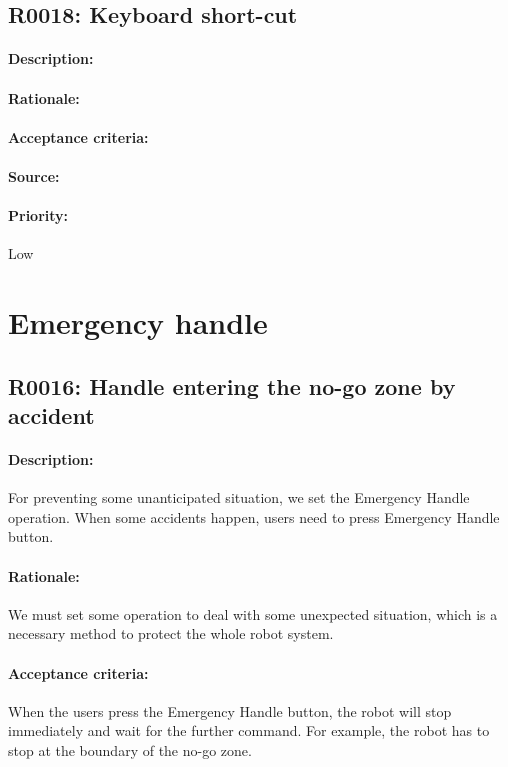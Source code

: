 \documentclass[11pt, a4paper]{report}
\begin{document}
\subsection{R0018: Keyboard short-cut}
\paragraph{Description:}

\paragraph{Rationale:}

\paragraph{Acceptance criteria:}

\paragraph{Source:}

\paragraph{Priority:}
Low


\section{Emergency handle}
\subsection{R0016: Handle entering the no-go zone by accident}
\paragraph{Description:}
For preventing some unanticipated situation, we set the Emergency Handle operation. When some accidents happen, users need to press Emergency Handle button.
\paragraph{Rationale:}
We must set some operation to deal with some unexpected situation, which is a necessary method to protect the whole robot system. 
\paragraph{Acceptance criteria:}
When the users press the Emergency Handle button, the robot will stop immediately and wait for the further command. For example, the robot has to stop at the boundary of the no-go zone. 
\end{document}
